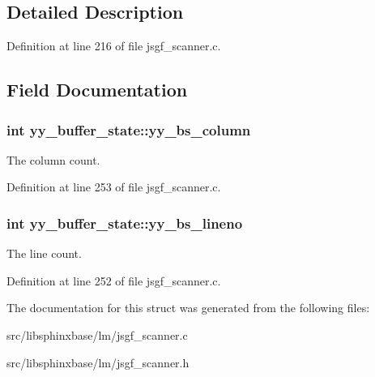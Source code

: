 \subsection{Detailed Description}


Definition at line 216 of file jsgf\+\_\+scanner.\+c.



\subsection{Field Documentation}
\subsubsection[{yy\+\_\+bs\+\_\+column}]{\setlength{\rightskip}{0pt plus 5cm}int yy\+\_\+buffer\+\_\+state\+::yy\+\_\+bs\+\_\+column}\label{structyy__buffer__state_a10c4fcd8be759e6bf11e6d3e8cdb0307}


The column count. 



Definition at line 253 of file jsgf\+\_\+scanner.\+c.

\subsubsection[{yy\+\_\+bs\+\_\+lineno}]{\setlength{\rightskip}{0pt plus 5cm}int yy\+\_\+buffer\+\_\+state\+::yy\+\_\+bs\+\_\+lineno}\label{structyy__buffer__state_a818e94bc9c766e683c60df1e9fd01199}


The line count. 



Definition at line 252 of file jsgf\+\_\+scanner.\+c.



The documentation for this struct was generated from the following files\+:\begin{DoxyCompactItemize}
\item 
src/libsphinxbase/lm/jsgf\+\_\+scanner.\+c\item 
src/libsphinxbase/lm/jsgf\+\_\+scanner.\+h\end{DoxyCompactItemize}
